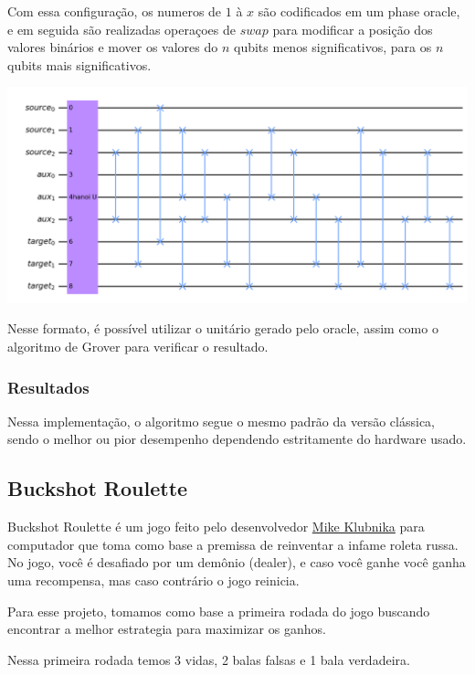 \documentclass{article}
\begin{document}
Com essa configuração, os numeros de $1$ à $x$ são codificados em um phase oracle, e em seguida são realizadas operaçoes de $swap$ para modificar a posição dos valores binários e mover os valores do $n$ qubits menos significativos, para os $n$ qubits mais significativos.

\begin{center}
	\includegraphics[scale=0.2]{hanoi_4_discs.png}
	\label{fig:hanoi}
\end{center}

Nesse formato, é possível utilizar o unitário gerado pelo oracle, assim como o algoritmo de Grover para verificar o resultado.

\subsubsection{Resultados}

Nessa implementação, o algoritmo segue o mesmo padrão da versão clássica, sendo o melhor ou pior desempenho dependendo estritamente do hardware usado.


\subsection{Buckshot Roulette} \label{buckshot}

Buckshot Roulette é um jogo feito pelo desenvolvedor \href{https://mikeklubnika.itch.io/}{Mike Klubnika} para computador que toma como base a premissa de reinventar a infame roleta russa. No jogo, você é desafiado por um demônio (dealer), e caso você ganhe você ganha uma recompensa, mas caso contrário o jogo reinicia.

Para esse projeto, tomamos como base a primeira rodada do jogo buscando encontrar a melhor estrategia para maximizar os ganhos.

Nessa primeira rodada temos 3 vidas, 2 balas falsas e 1 bala verdadeira.
\end{document}

